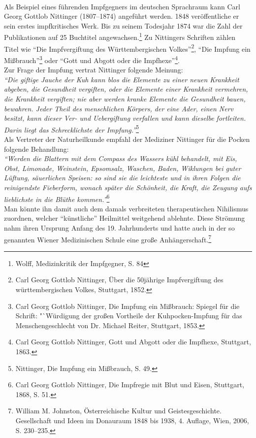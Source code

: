 \documentclass[
    a4paper,
    12pt,
    hyphens,
    chapterprefix=true,
    headheight=33pt,
    footheight=29pt,
    headings=optiontohead,
]{scrartcl}
\begin{document}
\\
Als Beispiel eines führenden Impfgegners im deutschen Sprachraum kann Carl Georg Gottlob Nittinger (1807--1874) angeführt werden. 1848 veröffentliche er sein erstes impfkritisches Werk. Bis zu seinem Todesjahr 1874 war die Zahl der Publikationen auf 25 Buchtitel angewachsen.\footnote{Wolff, Medizinkritik der Impfgegner, S. 84} Zu Nittingers Schriften zählen Titel wie "`Die Impfvergiftung des Württembergischen Volkes"'\footnote{Carl Georg Gottlob Nittinger, Über die 50jährige Impfvergiftung des württembergischen Volkes, Stuttgart, 1852.}, "`Die Impfung ein Mißbrauch"'\footnote{Carl Georg Gottlob Nittinger, Die Impfung ein Mißbrauch: Spiegel für die Schrift: "`Würdigung der großen Vortheile der Kuhpocken-Impfung für das Menschengeschlecht von Dr. Michael Reiter, Stuttgart, 1853.} oder "`Gott und Abgott oder die Impfhexe"'\footnote{Carl Georg Gottlob Nittinger, Gott und Abgott oder die Impfhexe, Stuttgart, 1863.}. \\
Zur Frage der Impfung vertrat Nittinger folgende Meinung: \\
\textit{"`Die giftige Jauche der Kuh kann blos die Elemente zu einer neuen Krankheit abgeben, die Gesundheit vergiften, oder die Elemente einer Krankheit vermehren, die Krankheit vergiften; nie aber werden kranke Elemente die Gesundheit bauen, bewahren. Jeder Theil des menschlichen Körpers, der eine Ader, einen Nerv besitzt, kann dieser Ver- und Uebergiftung verfallen und kann dieselbe fortleiten. Darin liegt das Schrecklichste der Impfung."'}\footnote{Nittinger, Die Impfung ein Mißbrauch, S. 49.}\\
Als Vertreter der Naturheilkunde empfahl der Mediziner Nittinger für die Pocken folgende Behandlung: \\
\textit{"`Werden die Blattern mit dem Compass des Wassers kühl behandelt, mit Eis, Obst, Limonade, Weinstein, Epsomsalz, Waschen, Baden, Wiklungen bei guter Lüftung, säuerlichen Speisen: so sind sie die leichteste und in ihren Folgen die reinigendste Fieberform, wonach später die Schönheit, die Kraft, die Zeugung aufs lieblichste in die Blüthe kommen."'}\footnote{Carl Georg Gottlob Nittinger, Die Impfregie mit Blut und Eisen, Stuttgart, 1868, S. 51.}\\
Man könnte ihn damit auch dem damals verbreiteten therapeutischen Nihilismus zuordnen, welcher "`künstliche"' Heilmittel weitgehend ablehnte. Diese Strömung nahm ihren Ursprung Anfang des 19. Jahrhunderts und hatte auch in der so genannten Wiener Medizinischen Schule eine große Anhängerschaft.\footnote{William M. Johnston, Österreichische Kultur und Geistesgeschichte. Gesellschaft und Ideen im Donauraum 1848 bis 1938, 4. Auflage, Wien, 2006, S. 230--235.} \\
\end{document}
